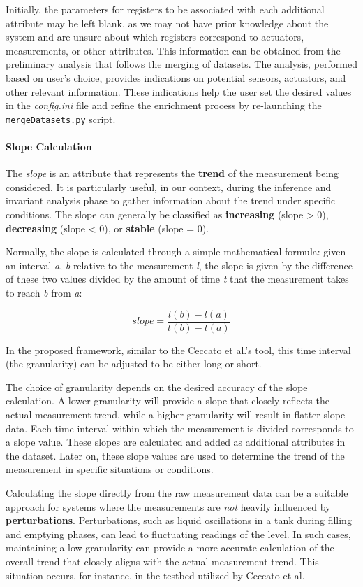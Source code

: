 Initially, the parameters for registers to be associated with each additional attribute may be left blank, as we may not have prior knowledge about the system and are unsure about which registers correspond to actuators, measurements, or other attributes. This information can be obtained from the preliminary analysis that follows the merging of datasets. The analysis, performed based on user's choice, provides indications on potential sensors, actuators, and other relevant information. These indications help the user set the desired values in the \textit{config.ini} file and refine the enrichment process by re-launching the \texttt{mergeDatasets.py} script.

\paragraph{Slope Calculation}
\label{par:4_slope_calculation}
The \textit{slope} is an attribute that represents the \textbf{trend} of the measurement being considered. It is particularly useful, in our context, during the inference and invariant analysis phase to gather information about the trend under specific conditions. The slope can generally be classified as \textbf{increasing} (slope > 0), \textbf{decreasing} (slope < 0), or \textbf{stable} (slope = 0).

Normally, the slope is calculated through a simple mathematical formula: given an interval \textit{a}, \textit{b} relative to the measurement \textit{l}, the slope is given by the difference of these two values divided by the amount of time \textit{t} that the measurement takes to reach \textit{b} from \textit{a}:

\[slope = \frac{l(b) -l(a)}{t(b) - t(a)}\]

In the proposed framework, similar to the Ceccato et al.'s tool, this time interval (the granularity) can be adjusted to be either long or short.

\bigskip
The choice of granularity depends on the desired accuracy of the slope calculation. A lower granularity will provide a slope that closely reflects the actual measurement trend, while a higher granularity will result in flatter slope data. Each time interval within which the measurement is divided corresponds to a slope value. These slopes are calculated and added as additional attributes in the dataset. Later on, these slope values are used to determine the trend of the measurement in specific situations or conditions.

\bigskip
Calculating the slope directly from the raw measurement data can be a suitable approach for systems where the measurements are \textit{not} heavily influenced by \textbf{perturbations}. Perturbations, such as liquid oscillations in a tank during filling and emptying phases, can lead to fluctuating readings of the level. In such cases, maintaining a low granularity can provide a more accurate calculation of the overall trend that closely aligns with the actual measurement trend. This situation occurs, for instance, in the testbed utilized by Ceccato et al.

